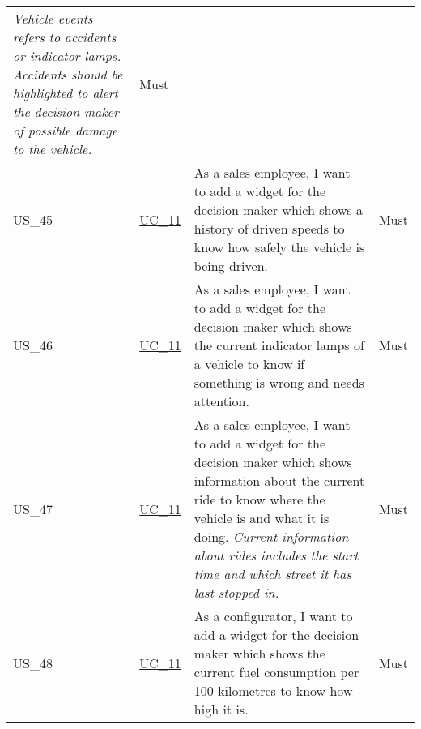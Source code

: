 \begin{footnotesize}
\begin{longtable}[L L L]{ p{} p{} p{} p{} }
      \newline\newline
      \emph{Vehicle events refers to accidents or indicator lamps. Accidents should be highlighted to alert the decision maker of possible damage to the vehicle.} & Must
      \\
      \hypertarget{Ref:US45}{US\_45} & \hyperlink{Ref:UC11}{UC\_11} & As a sales employee, I want to add a widget for the decision maker which shows a history of driven speeds to know how safely the vehicle is being driven. & Must \\
      \hypertarget{Ref:US46}{US\_46} & \hyperlink{Ref:UC11}{UC\_11} & As a sales employee, I want to add a widget for the decision maker which shows the current indicator lamps of a vehicle to know if something is wrong and needs attention. & Must \\
      \hypertarget{Ref:US47}{US\_47} & \hyperlink{Ref:UC11}{UC\_11} & As a sales employee, I want to add a widget for the decision maker which shows information about the current ride to know where the vehicle is and what it is doing.
      \newline\newline
      \emph{Current information about rides includes the start time and which street it has last stopped in.} & Must \\
      \hypertarget{Ref:US48}{US\_48} & \hyperlink{Ref:UC11}{UC\_11} & As a configurator, I want to add a widget for the decision maker which shows the current fuel consumption per 100 kilometres to know how high it is. & Must \\

      \bottomrule
    \end{longtable}
  \end{footnotesize}
  \rmfamily

